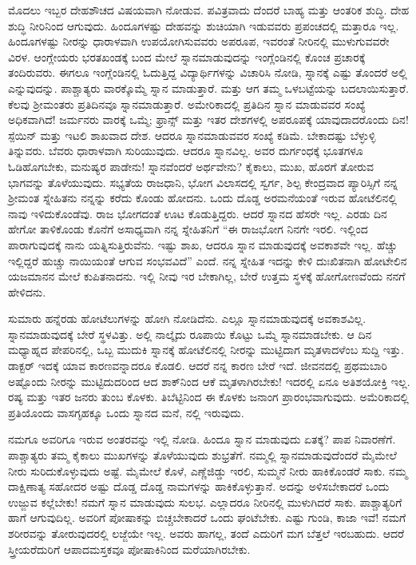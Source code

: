 ಮೊದಲು ಇಬ್ಬರ ದೇಹಶೌಚದ ವಿಷಯವಾಗಿ ನೋಡುವ. ಪವಿತ್ರವಾದು ದೆಂದರೆ ಬಾಹ್ಯ ಮತ್ತು ಆಂತರಿಕ ಶುದ್ಧಿ. ದೇಹ ಶುದ್ಧಿ ನೀರಿನಿಂದ ಆಗುವುದು. ಹಿಂದೂಗಳಷ್ಟು ದೇಹವನ್ನು ಶುಚಿಯಾಗಿ ಇಡುವವರು ಪ್ರಪಂಚದಲ್ಲಿ ಮತ್ತಾರೂ ಇಲ್ಲ. ಹಿಂದೂಗಳಷ್ಟು ನೀರನ್ನು ಧಾರಾಳವಾಗಿ ಉಪಯೋಗಿಸುವವರು ಅಪರೂಪ, ಇವರಂತೆ ನೀರಿನಲ್ಲಿ ಮುಳುಗುವವರೇ ವಿರಳ. ಆಂಗ್ಲೇಯರು ಭರತಖಂಡಕ್ಕೆ ಬಂದ ಮೇಲೆ ಸ್ನಾನಮಾಡುವುದನ್ನು ಇಂಗ್ಲೆಂಡಿನಲ್ಲಿ ಕೊಂಚ ಪ್ರಚಾರಕ್ಕೆ ತಂದಿರುವರು. ಈಗಲೂ ಇಂಗ್ಲೆಂಡಿನಲ್ಲಿ ಓದುತ್ತಿದ್ದ ವಿದ್ಯಾರ್ಥಿಗಳನ್ನು ವಿಚಾರಿಸಿ ನೋಡಿ, ಸ್ನಾನಕ್ಕೆ ಎಷ್ಟು ತೊಂದರೆ ಅಲ್ಲಿ ಎನ್ನುವುದನ್ನು. ಪಾಶ್ಚಾತ್ಯರು ವಾರಕ್ಕೊಮ್ಮೆ ಸ್ನಾನ ಮಾಡುತ್ತಾರೆ. ಮತ್ತು ಆಗ ತಮ್ಮ ಒಳಬಟ್ಟೆಯನ್ನು ಬದಲಾಯಿಸುತ್ತಾರೆ. ಕೆಲವು ಶ‍್ರೀಮಂತರು ಪ್ರತಿದಿನವೂ ಸ್ನಾನಮಾಡುತ್ತಾರೆ. ಅಮೇರಿಕಾದಲ್ಲಿ ಪ್ರತಿದಿನ ಸ್ನಾನ ಮಾಡುವವರ ಸಂಖ್ಯೆ ಅಧಿಕವಾಗಿದೆ! ಜರ್ಮನರು ವಾರಕ್ಕೆ ಒಮ್ಮೆ; ಫ್ರಾನ್ಸ್​ ಮತ್ತು ಇತರ ದೇಶಗಳಲ್ಲಿ ಅಪರೂಪಕ್ಕೆ ಯಾವುದಾದರೊಂದು ದಿನ! ಸ್ಪೆಯಿನ್​ ಮತ್ತು ಇಟಲಿ ಶಾಖವಾದ ದೇಶ. ಆದರೂ ಸ್ನಾನಮಾಡುವವರ ಸಂಖ್ಯೆ ಕಡಿಮೆ. ಬೇಕಾದಷ್ಟು ಬೆಳ್ಳುಳ್ಳಿ ತಿನ್ನುವರು. ಬೆವರು ಧಾರಾಳವಾಗಿ ಸುರಿಯುವುದು. ಆದರೂ ಸ್ನಾನವಿಲ್ಲ. ಅವರ ದುರ್ಗಂಧಕ್ಕೆ ಭೂತಗಳೂ ಓಡಿಹೊಗಬೇಕು, ಮನುಷ್ಯರ ಪಾಡೇನು! ಸ್ನಾನವೆಂದರೆ ಅರ್ಥವೇನು? ಕೈಕಾಲು, ಮುಖ, ಹೊರಗೆ ತೋರುವ ಭಾಗವನ್ನು ತೊಳೆಯುವುದು. ಸಭ್ಯತೆಯ ರಾಜಧಾನಿ, ಭೋಗ ವಿಲಾಸದಲ್ಲಿ ಸ್ವರ್ಗ, ಶಿಲ್ಪ ಕೇಂದ್ರವಾದ ಪ್ಯಾರಿಸ್ಸಿಗೆ ನನ್ನ ಶ‍್ರೀಮಂತ ಸ್ನೇಹಿತನು ನನ್ನನ್ನು ಕರೆದು ಕೊಂಡು ಹೋದನು. ಒಂದು ದೊಡ್ಡ ಅರಮನೆಯಂತೆ ಇರುವ ಹೋಟೆಲಿನಲ್ಲಿ ನಾವು ಇಳಿದುಕೊಂಡೆವು. ರಾಜ ಭೋಗದಂತೆ ಊಟ ಕೊಡುತ್ತಿದ್ದರು. ಆದರೆ ಸ್ನಾನದ ಹೆಸರೇ ಇಲ್ಲ. ಎರಡು ದಿನ ಹೇಗೋ ತಾಳಿಕೊಂಡು ಕೊನೆಗೆ ಅಸಾಧ್ಯವಾಗಿ ನನ್ನ ಸ್ನೇಹಿತನಿಗೆ “ಈ ರಾಜಭೋಗ ನಿನಗೇ ಇರಲಿ. ಇಲ್ಲಿಂದ ಪಾರಾಗುವುದಕ್ಕೆ ನಾನು ಯತ್ನಿಸುತ್ತಿರುವೆನು. ಇಷ್ಟು ಶಾಖ, ಆದರೂ ಸ್ನಾನ ಮಾಡುವುದಕ್ಕೆ ಅವಕಾಶವೇ ಇಲ್ಲ. ಹೆಚ್ಚು ಇಲ್ಲಿದ್ದರೆ ಹುಚ್ಚು ನಾಯಿಯಂತೆ ಆಗುವ ಸಂಭವವಿದೆ” ಎಂದೆ. ನನ್ನ ಸ್ನೇಹಿತ ಇದನ್ನು ಕೇಳಿ ದುಃಖಿತನಾಗಿ ಹೋಟೇಲಿನ ಯಜಮಾನನ ಮೇಲೆ ಕುಪಿತನಾದನು. ಇಲ್ಲಿ ನೀವು ಇರ ಬೇಕಾಗಿಲ್ಲ, ಬೇರೆ ಉತ್ತಮ ಸ್ಥಳಕ್ಕೆ ಹೋಗೋಣವೆಂದು ನನಗೆ ಹೇಳಿದನು.

ಸುಮಾರು ಹನ್ನೆರಡು ಹೋಟೆಲುಗಳನ್ನು ಹೋಗಿ ನೋಡಿದೆನು. ಎಲ್ಲೂ ಸ್ನಾನಮಾಡುವುದಕ್ಕೆ ಅವಕಾಶವಿಲ್ಲ. ಸ್ನಾನಮಾಡುವುದಕ್ಕೆ ಬೇರೆ ಸ್ಥಳವಿತ್ತು. ಅಲ್ಲಿ ನಾಲ್ಕೈದು ರೂಪಾಯಿ ಕೊಟ್ಟು ಒಮ್ಮೆ ಸ್ನಾನಮಾಡಬೇಕು. ಆ ದಿನ ಮಧ್ಯಾಹ್ನದ ಪೇಪರಿನಲ್ಲಿ, ಒಬ್ಬ ಮುದುಕಿ ಸ್ನಾನಕ್ಕೆ ಹೋಟೆಲಿನಲ್ಲಿ ನೀರನ್ನು ಮುಟ್ಟಿದಾಗ ಮೃತಳಾದಳೆಂಬ ಸುದ್ದಿ ಇತ್ತು. ಡಾಕ್ಟರ್​ ಇದಕ್ಕೆ ಯಾವ ಕಾರಣವನ್ನಾದರೂ ಕೊಡಲಿ. ಆದರೆ ನನ್ನ ಕಾರಣ ಬೇರೆ ಇದೆ. ಜೀವನದಲ್ಲಿ ಪ್ರಥಮಬಾರಿ ಅಷ್ಟೊಂದು ನೀರನ್ನು ಮುಟ್ಟಿದುದರಿಂದ ಆದ ಶಾಕ್​ನಿಂದ ಆಕೆ ಮೃತಳಾಗಿರಬೇಕು! ಇದರಲ್ಲಿ ಏನೂ ಅತಿಶಯೋಕ್ತಿ ಇಲ್ಲ. ರಷ್ಯ ಮತ್ತು ಇತರ ಜನರು ತುಂಬ ಕೊಳಕು. ತಿಬೆಟ್ಟಿನಿಂದ ಈ ಕೊಳಕು ಜನಾಂಗ ಪ್ರಾರಂಭವಾಗುವುದು. ಅಮೆರಿಕಾದಲ್ಲಿ ಪ್ರತಿಯೊಂದು ವಾಸಗೃಹಕ್ಕೂ ಒಂದು ಸ್ನಾನದ ಮನೆ, ನಲ್ಲಿ ಇರುವುದು.

ನಮಗೂ ಅವರಿಗೂ ಇರುವ ಅಂತರವನ್ನು ಇಲ್ಲಿ ನೋಡಿ. ಹಿಂದೂ ಸ್ನಾನ ಮಾಡುವುದು ಏತಕ್ಕೆ? ಪಾಪ ನಿವಾರಣೆಗೆ. ಪಾಶ್ಚಾತ್ಯರು ತಮ್ಮ ಕೈಕಾಲು ಮುಖಗಳನ್ನು ತೊಳೆಯುವುದು ಶುಭ್ರತೆಗೆ. ನಮ್ಮಲ್ಲಿ ಸ್ನಾನಮಾಡುವುದೆಂದರೆ ಮೈಮೇಲೆ ನೀರು ಸುರಿದುಕೊಳ್ಳುವುದು ಅಷ್ಟೆ. ಮೈಮೇಲೆ ಕೊಳೆ, ಎಣ್ಣೆಜಿಡ್ಡು ಇರಲಿ, ಸುಮ್ಮನೆ ನೀರು ಹಾಕಿಕೊಂಡರೆ ಸಾಕು. ನಮ್ಮ ದಾಕ್ಷಿಣಾತ್ಯ ಸಹೋದರ ಅಷ್ಟು ದೊಡ್ಡ ದೊಡ್ಡ ನಾಮಗಳನ್ನು ಹಾಕಿಕೊಳ್ಳುತ್ತಾನೆ. ಅದನ್ನು ಅಳಿಸಬೇಕಾದರೆ ಒಂದು ಉಜ್ಜುವ ಕಲ್ಲೆಬೇಕು! ನಮಗೆ ಸ್ನಾನ ಮಾಡುವುದು ಸುಲಭ. ಎಲ್ಲಾದರೂ ನೀರಿನಲ್ಲಿ ಮುಳುಗಿದರೆ ಸಾಕು. ಪಾಶ್ಚಾತ್ಯರಿಗೆ ಹಾಗೆ ಆಗುವುದಿಲ್ಲ. ಅವರಿಗೆ ಪೋಷಾಕನ್ನು ಬಿಚ್ಚಬೇಕಾದರೆ ಒಂದು ಘಂಟೆಬೇಕು. ಎಷ್ಟು ಗುಂಡಿ, ಕಾಜಾ ಇವೆ! ನಮಗೆ ಶರೀರವನ್ನು ತೋರುವುದರಲ್ಲಿ ಲಜ್ಜೆಯೇ ಇಲ್ಲ. ಅವರು ಹಾಗಲ್ಲ, ತಂದೆ ಎದುರಿಗೆ ಮಗ ಬೆತ್ತಲೆ ಇರಬಹುದು. ಆದರೆ ಸ್ತ್ರೀಯರೆದುರಿಗೆ ಆಪಾದಮಸ್ತಕವೂ ಪೋಷಾಕಿನಿಂದ ಮರೆಯಾಗಿರಬೇಕು.

